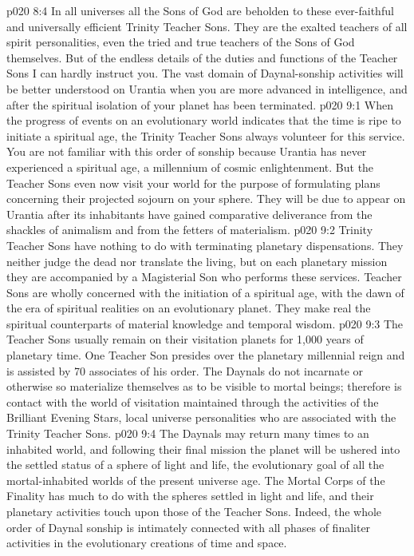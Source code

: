 \vs p020 8:4 In all universes all the Sons of God are beholden to these ever\hyp{}faithful and universally efficient Trinity Teacher Sons. They are the exalted teachers of all spirit personalities, even the tried and true teachers of the Sons of God themselves. But of the endless details of the duties and functions of the Teacher Sons I can hardly instruct you. The vast domain of Daynal\hyp{}sonship activities will be better understood on Urantia when you are more advanced in intelligence, and after the spiritual isolation of your planet has been terminated.
\vs p020 9:1 When the progress of events on an evolutionary world indicates that the time is ripe to initiate a spiritual age, the Trinity Teacher Sons always volunteer for this service. You are not familiar with this order of sonship because Urantia has never experienced a spiritual age, a millennium of cosmic enlightenment. But the Teacher Sons even now visit your world for the purpose of formulating plans concerning their projected sojourn on your sphere. They will be due to appear on Urantia after its inhabitants have gained comparative deliverance from the shackles of animalism and from the fetters of materialism.
\vs p020 9:2 Trinity Teacher Sons have nothing to do with terminating planetary dispensations. They neither judge the dead nor translate the living, but on each planetary mission they are accompanied by a Magisterial Son who performs these services. Teacher Sons are wholly concerned with the initiation of a spiritual age, with the dawn of the era of spiritual realities on an evolutionary planet. They make real the spiritual counterparts of material knowledge and temporal wisdom.
\vs p020 9:3 The Teacher Sons usually remain on their visitation planets for 1,000 years of planetary time. One Teacher Son presides over the planetary millennial reign and is assisted by 70 associates of his order. The Daynals do not incarnate or otherwise so materialize themselves as to be visible to mortal beings; therefore is contact with the world of visitation maintained through the activities of the Brilliant Evening Stars, local universe personalities who are associated with the Trinity Teacher Sons.
\vs p020 9:4 The Daynals may return many times to an inhabited world, and following their final mission the planet will be ushered into the settled status of a sphere of light and life, the evolutionary goal of all the mortal\hyp{}inhabited worlds of the present universe age. The Mortal Corps of the Finality has much to do with the spheres settled in light and life, and their planetary activities touch upon those of the Teacher Sons. Indeed, the whole order of Daynal sonship is intimately connected with all phases of finaliter activities in the evolutionary creations of time and space.
